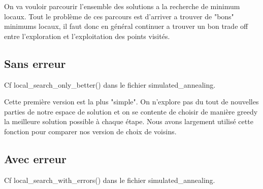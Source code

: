 \documentclass[10pt,a4paper]{article}
\begin{document}
On va vouloir parcourir l'ensemble des solutions a la recherche de minimum locaux. Tout le problème de ces parcours est d'arriver a trouver de "bons" minimums locaux, il faut donc en général continuer a trouver un bon trade off entre l'exploration et l'exploitation des points visités.  

\subsection{Sans erreur}


Cf local\_search\_only\_better() dans le fichier simulated\_annealing.

Cette première version est la plus "simple". On n'explore pas du tout de nouvelles parties de notre espace de solution et on se contente de choisir de manière greedy la meilleure solution possible à chaque étape. Nous avons largement utilisé cette fonction pour comparer nos version de choix de voisins. 

\subsection{Avec erreur}

Cf local\_search\_with\_errors() dans le fichier simulated\_annealing.
\end{document}
